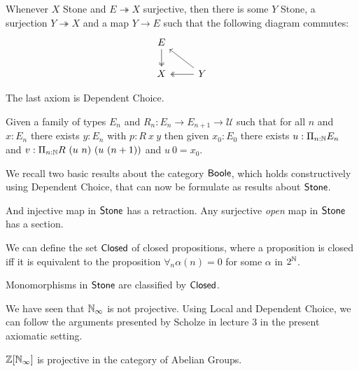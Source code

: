 \begin{axiom}
  Whenever $X$ Stone and $E\twoheadrightarrow X$ surjective, then there is some $Y$ Stone,
    a surjection $Y \twoheadrightarrow X$ and a map $Y\to E$ such that the following diagram commutes:
    \begin{equation}\begin{tikzcd}
      E \arrow[d,""',two heads]\\
      X & \arrow[l, "", two heads] Y\arrow[lu, ""']
    \end{tikzcd}\end{equation}  
\end{axiom} 




The last axiom is Dependent Choice.

\begin{axiom}
  Given a family of types $E_n$ and $R_n:E_n\rightarrow E_{n+1}\rightarrow {\mathcal U}$ such that
  for all $n$ and $x:E_n$ there exists $y:E_n$ with $p:R~x~y$ then given $x_0:E_0$ there exists
  $u:\Pi_{n:\mathbb{N}}E_n$ and $v:\Pi_{n:\mathbb{N}}R~(u~n)~(u~(n+1))$ and $u~0 = x_0$.
\end{axiom}

\medskip

We recall two basic results about the category $\mathsf{Boole}$, which holds constructively using Dependent Choice,
that can now be formulate as results about $\mathsf{Stone}$.

\begin{proposition}
  And injective map in $\mathsf{Stone}$ has a retraction. Any surjective {\em open} map in $\mathsf{Stone}$ has a section.
\end{proposition}

\medskip

We can define the set $\mathsf{Closed}$ of closed propositions, where a proposition is closed iff it is equivalent to
the proposition $\forall_n \alpha(n) = 0$ for some $\alpha$ in $2^{\mathbb{N}}$.

\begin{theorem}
  Monomorphisms in $\mathsf{Stone}$ are classified by $\mathsf{Closed}$.
\end{theorem}

\medskip

We have seen that $\mathbb{N}_{\infty}$ is not projective. Using Local and Dependent Choice, we can 
follow the arguments presented by Scholze in lecture 3 in the present axiomatic setting. 

\begin{theorem}
  $\mathbb{Z}[\mathbb{N}_{\infty}]$ is projective in the category of Abelian Groups.
\end{theorem}

